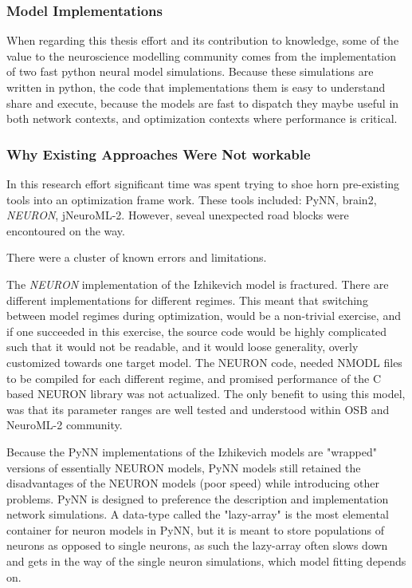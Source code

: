 
    

 \subsubsection{Model Implementations}   
 
 When regarding this thesis effort and its contribution to knowledge, 
 some of the value to the neuroscience modelling community comes from the implementation of two fast python neural model simulations. Because these simulations are written in python, the code that implementations them is easy to understand share and execute, because the models are fast to dispatch they maybe useful in both network contexts, and optimization contexts where performance is critical. 
 


\subsubsection{Why Existing Approaches Were Not workable}
In this research effort significant time was spent trying to shoe horn pre-existing tools into an optimization frame work. These tools included:  PyNN, brain2, \emph{NEURON}, jNeuroML-2. However, seveal unexpected road blocks were encontoured on the way.
 

There were a cluster of known errors and limitations. 
 
 
The \emph{NEURON} implementation of the Izhikevich model is fractured. There are different implementations for different regimes. This meant that switching between model regimes during optimization, would be a non-trivial exercise, and if one succeeded in this exercise, the source code would be highly complicated such that it would not be readable, and it would loose generality, overly customized towards one target model. The NEURON code, needed NMODL files to be compiled for each different regime, and promised performance of the C based NEURON library was not actualized. The only benefit to using this model, was that its parameter ranges are well tested and understood within OSB and NeuroML-2 community.

Because the PyNN implementations of the Izhikevich models are "wrapped" versions of essentially NEURON models, PyNN models still retained the disadvantages of the NEURON models (poor speed) while introducing other problems. PyNN is designed to preference the description and implementation network simulations. A data-type called the "lazy-array" is the most elemental container for neuron models in PyNN, but it is meant to store populations of neurons as opposed to single neurons, as such the lazy-array often slows down and gets in the way of the single neuron simulations, which model fitting depends on.



